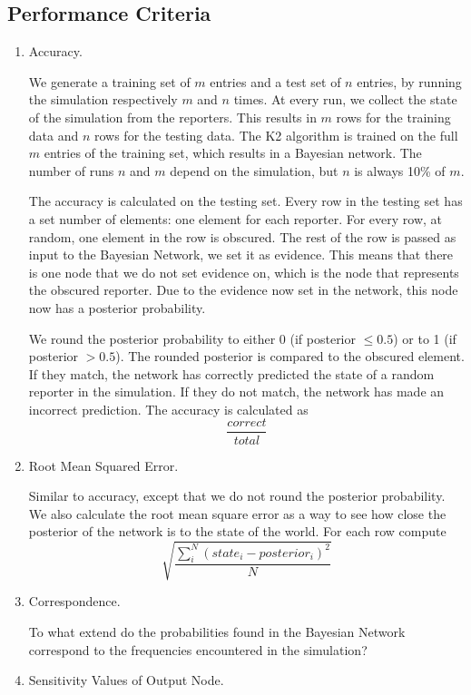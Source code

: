 \subsection{Performance Criteria}
\begin{enumerate}
\item Accuracy.

We generate a training set of $m$ entries and a test set of $n$ entries, by running the simulation respectively $m$ and $n$ times. At every run, we collect the state of the simulation from the reporters. This results in $m$ rows for the training data and $n$ rows for the testing data. The K2 algorithm is trained on the full $m$ entries of the training set, which results in a Bayesian network. The number of runs $n$ and $m$ depend on the simulation, but $n$ is always 10\% of $m$.

The accuracy is calculated on the testing set. Every row in the testing set has a set number of elements: one element for each reporter. For every row, at random, one element in the row is obscured. The rest of the row is passed as input to the Bayesian Network, we set it as evidence. This means that there is one node that we do not set evidence on, which is the node that represents the obscured reporter. Due to the evidence now set in the network, this node now has a posterior probability. 

 We round the posterior probability to either 0 (if posterior $\leq 0.5$) or to 1 (if posterior $>0.5$). The rounded posterior is compared to the obscured element. If they match, the network has correctly predicted the state of a random reporter in the simulation. If they do not match, the network has made an incorrect prediction. The accuracy is calculated as \[\frac{correct}{total}\]


\item Root Mean Squared Error.

Similar to accuracy, except that we do not round the posterior probability. We also calculate the root mean square error as a way to see how close the posterior of the network is to the state of the world. For each row compute \[\sqrt{\frac{\sum_i^N (state_i - posterior_i)^2}{N}}\] 

\item Correspondence.

To what extend do the probabilities found in the Bayesian Network correspond to the frequencies encountered in the simulation? 

\item Sensitivity Values of Output Node.


\end{enumerate}
